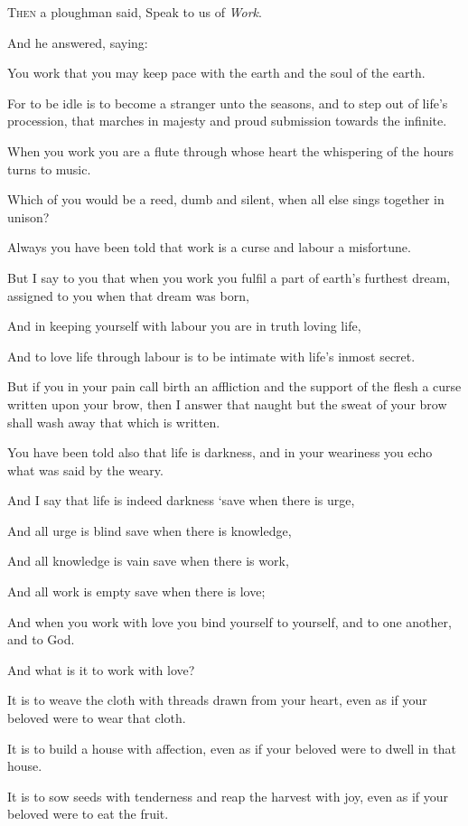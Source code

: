 \lettrine{T}{hen} a ploughman said, Speak
to us of \textit{Work}.

\bigskip
And he answered, saying:

You work that you may keep pace with the
earth and the soul of the earth.

For to be idle is to become a stranger
unto the seasons, and to step out of
life’s procession, that marches in
majesty and proud submission towards the
infinite.

When you work you are a flute through
whose heart the whispering of the hours
turns to music.

Which of you would be a reed, dumb and
silent, when all else sings together in
unison?

Always you have been told that work is a
curse and labour a misfortune.

But I say to you that when you work you
fulfil a part of earth’s furthest dream,
assigned to you when that dream was
born,

And in keeping yourself with labour you
are in truth loving life,

And to love life through labour is to be
intimate with life’s inmost secret.


But if you in your pain call birth an
affliction and the support of the flesh
a curse written upon your brow, then I
answer that naught but the sweat of
your brow shall wash away that which is
written.

You have been told also that life is
darkness, and in your weariness you echo
what was said by the weary.

And I say that life is indeed darkness
`save when there is urge,

And all urge is blind save when there is
knowledge,

And all knowledge is vain save when
there is work,

And all work is empty save when there is
love;

And when you work with love you bind
yourself to yourself, and to one
another, and to God.



And what is it to work with love?

It is to weave the cloth with threads
drawn from your heart, even as if your
beloved were to wear that cloth.

It is to build a house with affection,
even as if your beloved were to dwell in
that house.

It is to sow seeds with tenderness and
reap the harvest with joy, even as if
your beloved were to eat the fruit.

